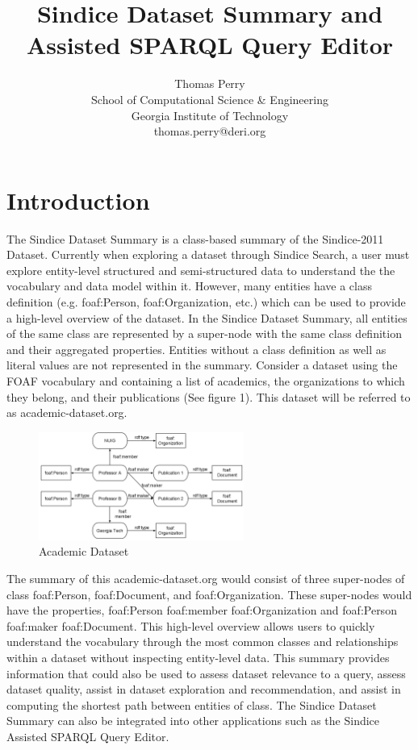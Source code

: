 \documentclass[11pt,onecolumn]{article}
\title{Sindice Dataset Summary and Assisted SPARQL Query Editor}
\author{Thomas Perry\\School of Computational Science \& Engineering\\ Georgia Institute of Technology\\ thomas.perry@deri.org}
\begin{document}
\normalsize
\maketitle


\section{Introduction}
The Sindice Dataset Summary is a class-based summary of the Sindice-2011 Dataset.  Currently when exploring a dataset through Sindice Search, a user must explore entity-level structured and semi-structured data to understand the the vocabulary and data model within it.  However, many entities have a class definition (e.g. foaf:Person, foaf:Organization, etc.) which can be used to provide a high-level overview of the dataset.  In the Sindice Dataset Summary, all entities of the same class are represented by a super-node with the same class definition and their aggregated properties.  Entities without a class definition as well as literal values are not represented in the summary.  Consider a dataset using the FOAF vocabulary and containing a list of academics, the organizations to which they belong, and their publications (See figure 1).  This dataset will be referred to as academic-dataset.org.  

\begin{figure}
  \centering
    \includegraphics[width=0.6\textwidth]{Diagram1.png}
    \caption{Academic Dataset}
\end{figure}

The summary of this academic-dataset.org would consist of three super-nodes of class foaf:Person, foaf:Document, and foaf:Organization.  These super-nodes would have the properties, foaf:Person foaf:member foaf:Organization and foaf:Person foaf:maker foaf:Document.  This high-level overview allows users to quickly understand the vocabulary through the most common classes and relationships within a dataset without inspecting entity-level data.  This summary provides information that could also be used to assess dataset relevance to a query, assess dataset quality, assist in dataset exploration and recommendation, and assist in computing the shortest path between entities of class.  The Sindice Dataset Summary can also be integrated into other applications such as the Sindice Assisted SPARQL Query Editor.
 
\end{document}
